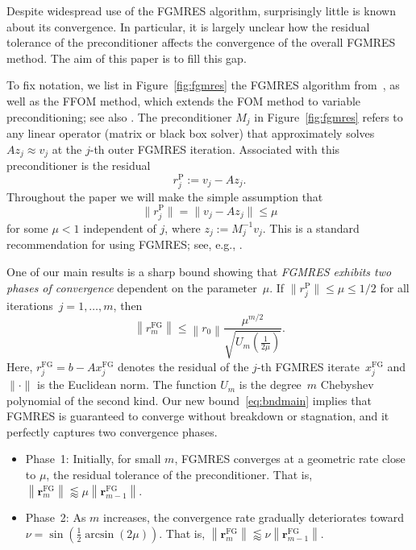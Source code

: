 \documentclass{siamart251216}
\begin{document}
Despite widespread use of the FGMRES algorithm, surprisingly little is known about its convergence. In particular, it is largely unclear how the residual tolerance of the preconditioner affects the convergence of the overall FGMRES method. The aim of this paper is to fill this gap.



To fix notation, we list  in Figure~\ref{fig:fgmres} the  FGMRES algorithm from~\cite{saad1993flexible}, as well as the FFOM method, which extends the FOM method \cite[Sec.~6.4]{saad2011numerical} to variable preconditioning; see also \cite{vuik1995new,guttel2025stabilizing}. The preconditioner $M_j$ in Figure~\ref{fig:fgmres} refers to any linear operator (matrix or black box solver) that approximately solves $A z_j \approx v_j$ at the $j$-th outer FGMRES iteration. Associated with this preconditioner is the residual
\[
    r_j^{\mathrm{P}} := v_j - A z_j.
\]
Throughout the paper we will make the simple assumption that
\begin{equation}\label{eq:assumemu}
    \|r_j^{\mathrm{P}}\| = \|v_j - A z_j\| \leq \mu
\end{equation}
for some $\mu < 1$ independent of $j$, where $z_j := M_j^{-1} v_j$. This is a standard recommendation for using FGMRES; see, e.g., \cite[Sec.~10]{simoncini2007recent}. 

One of our main results is a sharp bound showing that \emph{FGMRES exhibits two phases of convergence} dependent on the parameter~$\mu$.  If $\|r_j^{\mathrm{P}}\| \leq \mu \leq 1/2$ for all iterations~$j=1,\ldots,m$, then
\begin{equation}\label{eq:bndmain}
    \left\|r_m^{\mathrm{FG}}\right\| \leq \left\|r_0\right\| \frac{\mu^{m/2}}{\sqrt{U_m\left(\frac{1}{2\mu}\right)}}.
\end{equation}
Here, $r_j^{\mathrm{FG}} =  b - A x_j^{\mathrm{FG}}$ denotes the residual of the $j$-th FGMRES iterate~$x_j^{\mathrm{FG}}$ and $\|\cdot\|$ is the Euclidean norm. The function $U_m$ is the degree~$m$ Chebyshev polynomial of the second kind. 
Our new bound~\eqref{eq:bndmain} implies that FGMRES is guaranteed to converge without breakdown or stagnation, and it perfectly captures two convergence phases.
\smallskip
\begin{itemize}
    \item Phase~1: Initially, for small $m$, FGMRES  converges at a geometric rate close to $\mu$, the residual tolerance of the preconditioner. That is, $\left\|\mathbf{r}_m^{\mathrm{FG}}\right\| \lessapprox \mu \left\|\mathbf{r}_{m-1}^{\mathrm{FG}}\right\|$.
    \item Phase~2: As $m$ increases, the convergence rate gradually deteriorates toward~$\nu = \sin(\frac{1}{2} \arcsin(2\mu))$. That is, $\left\|\mathbf{r}_m^{\mathrm{FG}}\right\| \lessapprox \nu \left\|\mathbf{r}_{m-1}^{\mathrm{FG}}\right\|$.
\end{itemize}
\smallskip
\end{document}

